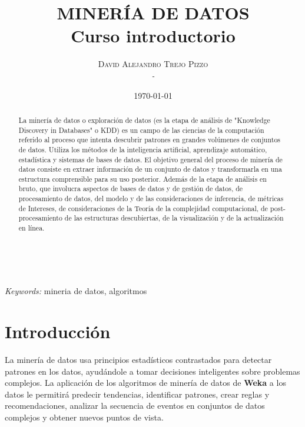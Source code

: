 \documentclass[a4paper, 11pt]{article} %
\title{\textbf{MINERÍA DE DATOS}\\ %
Curso introductorio} %
\author{\textsc{David Alejandro Trejo Pizzo} %
\\{\textit{-}}} %
\date{\today} %
\makeatletter
\renewcommand{\maketitle}{ %
\begin{flushright} %
{\LARGE\@title} %

\vspace{50pt} %

{\large\@author} %
\\\@date %

\vspace{40pt} %
\end{flushright}
}
\makeatother
\begin{document}
\maketitle

\begin{abstract}
La minería de datos o exploración de datos (es la etapa de análisis de "Knowledge Discovery in Databases" o KDD) es un campo de las ciencias de la computación referido al proceso que intenta descubrir patrones en grandes volúmenes de conjuntos de datos. Utiliza los métodos de la inteligencia artificial, aprendizaje automático, estadística y sistemas de bases de datos. El objetivo general del proceso de minería de datos consiste en extraer información de un conjunto de datos y transformarla en una estructura comprensible para su uso posterior. Además de la etapa de análisis en bruto, que involucra aspectos de bases de datos y de gestión de datos, de procesamiento de datos, del modelo y de las consideraciones de inferencia, de métricas de Intereses, de consideraciones de la Teoría de la complejidad computacional, de post-procesamiento de las estructuras descubiertas, de la visualización y de la actualización en línea.
\end{abstract}

\hspace*{3,6mm}\textit{Keywords:} mineria de datos, algoritmos

\vspace{30pt}


\section*{Introducción}

La minería de datos usa principios estadísticos contrastados para detectar patrones en los datos, ayudándole a tomar decisiones inteligentes sobre problemas complejos. La aplicación de los algoritmos de minería de datos de \textbf{Weka} a los datos le permitirá predecir tendencias, identificar patrones, crear reglas y recomendaciones, analizar la secuencia de eventos en conjuntos de datos complejos y obtener nuevos puntos de vista.\\
\end{document}
